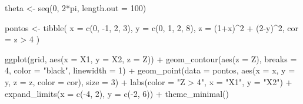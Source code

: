 \documentclass[
  a4paperpaper,
]{article}
\newenvironment{Shaded}{\begin{snugshade}}{\end{snugshade}}
\newcommand{\AttributeTok}[1]{\textcolor[rgb]{0.40,0.45,0.13}{#1}}
\newcommand{\DecValTok}[1]{\textcolor[rgb]{0.68,0.00,0.00}{#1}}
\newcommand{\FunctionTok}[1]{\textcolor[rgb]{0.28,0.35,0.67}{#1}}
\newcommand{\NormalTok}[1]{\textcolor[rgb]{0.00,0.23,0.31}{#1}}
\newcommand{\OtherTok}[1]{\textcolor[rgb]{0.00,0.23,0.31}{#1}}
\newcommand{\SpecialCharTok}[1]{\textcolor[rgb]{0.37,0.37,0.37}{#1}}
\newcommand{\StringTok}[1]{\textcolor[rgb]{0.13,0.47,0.30}{#1}}
\begin{document}
\begin{Shaded}
\begin{Highlighting}[]
\NormalTok{theta }\OtherTok{\textless{}{-}} \FunctionTok{seq}\NormalTok{(}\DecValTok{0}\NormalTok{, }\DecValTok{2}\SpecialCharTok{*}\NormalTok{pi, }\AttributeTok{length.out =} \DecValTok{100}\NormalTok{)}

\NormalTok{pontos }\OtherTok{\textless{}{-}} \FunctionTok{tibble}\NormalTok{(}
  \AttributeTok{x =} \FunctionTok{c}\NormalTok{(}\DecValTok{0}\NormalTok{, }\SpecialCharTok{{-}}\DecValTok{1}\NormalTok{, }\DecValTok{2}\NormalTok{, }\DecValTok{3}\NormalTok{),}
  \AttributeTok{y =} \FunctionTok{c}\NormalTok{(}\DecValTok{0}\NormalTok{, }\DecValTok{1}\NormalTok{, }\DecValTok{2}\NormalTok{, }\DecValTok{8}\NormalTok{),}
  \AttributeTok{z =}\NormalTok{ (}\DecValTok{1}\SpecialCharTok{+}\NormalTok{x)}\SpecialCharTok{\^{}}\DecValTok{2} \SpecialCharTok{+}\NormalTok{ (}\DecValTok{2}\SpecialCharTok{{-}}\NormalTok{y)}\SpecialCharTok{\^{}}\DecValTok{2}\NormalTok{, }
  \AttributeTok{cor =}\NormalTok{ z }\SpecialCharTok{\textgreater{}} \DecValTok{4}
\NormalTok{)}

\FunctionTok{ggplot}\NormalTok{(grid, }\FunctionTok{aes}\NormalTok{(}\AttributeTok{x =}\NormalTok{ X1, }\AttributeTok{y =}\NormalTok{ X2, }\AttributeTok{z =}\NormalTok{ Z)) }\SpecialCharTok{+}
  \FunctionTok{geom\_contour}\NormalTok{(}\FunctionTok{aes}\NormalTok{(}\AttributeTok{z =}\NormalTok{ Z), }\AttributeTok{breaks =} \DecValTok{4}\NormalTok{, }\AttributeTok{color =} \StringTok{"black"}\NormalTok{, }\AttributeTok{linewidth =} \DecValTok{1}\NormalTok{) }\SpecialCharTok{+}
  \FunctionTok{geom\_point}\NormalTok{(}\AttributeTok{data =}\NormalTok{ pontos, }\FunctionTok{aes}\NormalTok{(}\AttributeTok{x =}\NormalTok{ x, }\AttributeTok{y =}\NormalTok{ y, }\AttributeTok{z =}\NormalTok{ z, }\AttributeTok{color =}\NormalTok{ cor), }\AttributeTok{size =} \DecValTok{3}\NormalTok{) }\SpecialCharTok{+}
  \FunctionTok{labs}\NormalTok{(}\AttributeTok{color =} \StringTok{"Z \textgreater{} 4"}\NormalTok{,}
       \AttributeTok{x =} \StringTok{"X1"}\NormalTok{, }\AttributeTok{y =} \StringTok{"X2"}\NormalTok{) }\SpecialCharTok{+}
  \FunctionTok{expand\_limits}\NormalTok{(}\AttributeTok{x =} \FunctionTok{c}\NormalTok{(}\SpecialCharTok{{-}}\DecValTok{4}\NormalTok{, }\DecValTok{2}\NormalTok{), }\AttributeTok{y =} \FunctionTok{c}\NormalTok{(}\SpecialCharTok{{-}}\DecValTok{2}\NormalTok{, }\DecValTok{6}\NormalTok{)) }\SpecialCharTok{+}
  \FunctionTok{theme\_minimal}\NormalTok{()}
\end{Highlighting}
\end{Shaded}
\end{document}
